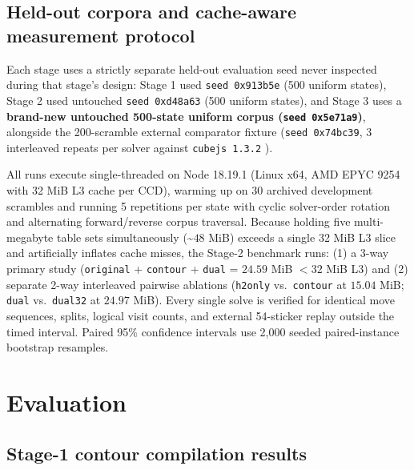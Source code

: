 \documentclass[10pt,twocolumn,letterpaper]{article}
\begin{document}
\hypertarget{held-out-corpora-and-cache-aware-measurement-protocol}{%
\subsection{Held-out corpora and cache-aware measurement protocol}\label{held-out-corpora-and-cache-aware-measurement-protocol}}

Each stage uses a strictly separate held-out evaluation seed never
inspected during that stage's design: Stage 1 used
\texttt{seed\ 0x913b5e} (500 uniform states), Stage 2 used untouched
\texttt{seed\ 0xd48a63} (500 uniform states), and Stage 3 uses a
\textbf{brand-new untouched 500-state uniform corpus
(\texttt{seed\ 0x5e71a9})}, alongside the 200-scramble external
comparator fixture (\texttt{seed\ 0x74bc39}, 3 interleaved repeats per
solver against \texttt{cubejs\ 1.3.2} \cite{cubejs}).

All runs execute single-threaded on Node 18.19.1 (Linux x64, AMD EPYC
9254 with 32 MiB L3 cache per CCD), warming up on 30 archived
development scrambles and running 5 repetitions per state with cyclic
solver-order rotation and alternating forward/reverse corpus traversal.
Because holding five multi-megabyte table sets simultaneously
(\textasciitilde{}\(48\) MiB) exceeds a single 32 MiB L3 slice and
artificially inflates cache misses, the Stage-2 benchmark runs: (1) a
3-way primary study (\texttt{original} + \texttt{contour} +
\texttt{dual} = \(24.59\) MiB \(< 32\) MiB L3) and (2) separate 2-way
interleaved pairwise ablations (\texttt{h2only} vs.~\texttt{contour} at
\(15.04\) MiB; \texttt{dual} vs.~\texttt{dual32} at \(24.97\) MiB).
Every single solve is verified for identical move sequences, splits,
logical visit counts, and external 54-sticker replay outside the timed
interval. Paired 95\% confidence intervals use 2,000 seeded
paired-instance bootstrap resamples.

\hypertarget{evaluation}{%
\section{Evaluation}\label{evaluation}}

\hypertarget{stage-1-contour-compilation-results}{%
\subsection{Stage-1 contour compilation results}\label{stage-1-contour-compilation-results}}
\end{document}

